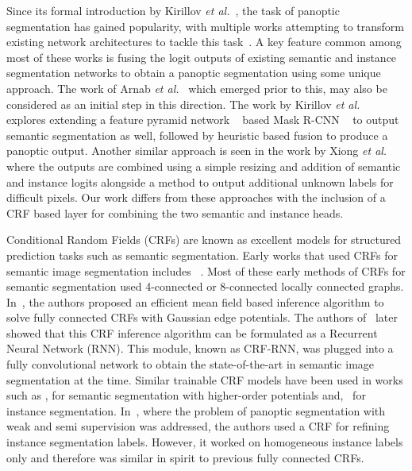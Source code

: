 Since its formal introduction by Kirillov \emph{et al.}~\cite{panoptickirillov2017}, the task of panoptic segmentation has gained popularity, with multiple works attempting to transform existing network architectures to tackle this task~\cite{panoptic_spatial_ranking, panoptic_DeeperLab, panoptic_SSAP, panoptic_attention, panoptic_scene, Upsnet_paper}. A key feature common among most of these works is fusing the logit outputs of existing semantic and instance segmentation networks to obtain a panoptic segmentation using some unique approach. The work of Arnab \emph{et al.}~\cite{Anurag17} which emerged prior to this, may also be considered as an initial step in this direction. The work by Kirillov \emph{et al.}~\cite{panoptics_fpn} explores extending a feature pyramid network ~\cite{FPN_paper} based Mask R-CNN ~\cite{mask_rcnn} to output semantic segmentation as well, followed by heuristic based fusion to produce a panoptic output. Another similar approach is seen in the work by Xiong \emph{et al.}~\cite{Upsnet_paper} where the outputs are combined using a simple resizing and addition of semantic and instance logits alongside a method to output additional unknown labels for difficult pixels. Our work differs from these approaches with the inclusion of a CRF based layer for combining the two semantic and instance heads. 

Conditional Random Fields (CRFs) are known as excellent models for structured prediction tasks such as semantic segmentation. Early works that used CRFs for semantic image segmentation includes ~\cite{instanceCRF01, instanceCRF02}. Most of these early methods of CRFs for semantic segmentation used 4-connected or 8-connected locally connected graphs. In~\cite{densecrf}, the authors proposed an efficient mean field based inference algorithm to solve fully connected CRFs with Gaussian edge potentials. The authors of~\cite{Zhen_ICCV15_CRFRNN} later showed that this CRF inference algorithm can be formulated as a Recurrent Neural Network (RNN). This module, known as CRF-RNN, was plugged into a fully convolutional network to obtain the state-of-the-art in semantic image segmentation at the time. Similar trainable CRF models have been used in works such as \cite{arnab_eccv_2016}, for semantic segmentation with higher-order potentials and,~\cite{Anurag17} for instance segmentation. In~\cite{li_eccv_2018}, where the problem of panoptic segmentation with weak and semi supervision was addressed, the authors used a CRF for refining instance segmentation labels. However, it worked on homogeneous instance labels only and therefore was similar in spirit to previous fully connected CRFs.

